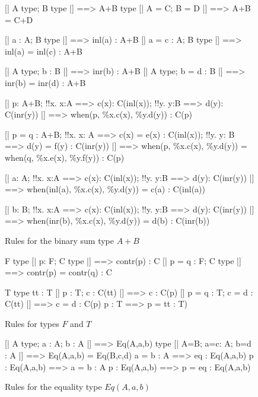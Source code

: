 \begin{figure} 
\begin{ttbox}
       [| A type;  B type |] ==> A+B type
      [| A = C;  B = D |] ==> A+B = C+D

   [| a : A;  B type |] ==> inl(a) : A+B
  [| a = c : A;  B type |] ==> inl(a) = inl(c) : A+B

   [| A type;  b : B |] ==> inr(b) : A+B
  [| A type;  b = d : B |] ==> inr(b) = inr(d) : A+B

     [| p: A+B;
             !!x. x:A ==> c(x): C(inl(x));  
             !!y. y:B ==> d(y): C(inr(y))
          |] ==> when(p, \%x.c(x), \%y.d(y)) : C(p)

    [| p = q : A+B;
             !!x. x: A ==> c(x) = e(x) : C(inl(x));   
             !!y. y: B ==> d(y) = f(y) : C(inr(y))
          |] ==> when(p, \%x.c(x), \%y.d(y)) = 
                 when(q, \%x.e(x), \%y.f(y)) : C(p)

 [| a: A;
             !!x. x:A ==> c(x): C(inl(x));  
             !!y. y:B ==> d(y): C(inr(y))
          |] ==> when(inl(a), \%x.c(x), \%y.d(y)) = c(a) : C(inl(a))

 [| b: B;
             !!x. x:A ==> c(x): C(inl(x));  
             !!y. y:B ==> d(y): C(inr(y))
          |] ==> when(inr(b), \%x.c(x), \%y.d(y)) = d(b) : C(inr(b))
\end{ttbox}
\caption{Rules for the binary sum type $A+B$} \label{ctt-plus}
\end{figure}


\begin{figure} 
\begin{ttbox}
        F type
        [| p: F;  C type |] ==> contr(p) : C
       [| p = q : F;  C type |] ==> contr(p) = contr(q) : C

        T type
        tt : T
        [| p : T;  c : C(tt) |] ==> c : C(p)
       [| p = q : T;  c = d : C(tt) |] ==> c = d : C(p)
        p : T ==> p = tt : T)
\end{ttbox}

\caption{Rules for types $F$ and $T$} \label{ctt-ft}
\end{figure}


\begin{figure} 
\begin{ttbox}
       [| A type;  a : A;  b : A |] ==> Eq(A,a,b) type
      [| A=B;  a=c: A;  b=d : A |] ==> Eq(A,a,b) = Eq(B,c,d)
       a = b : A ==> eq : Eq(A,a,b)
       p : Eq(A,a,b) ==> a = b : A
       p : Eq(A,a,b) ==> p = eq : Eq(A,a,b)
\end{ttbox}
\caption{Rules for the equality type $Eq(A,a,b)$} \label{ctt-eq}
\end{figure}


